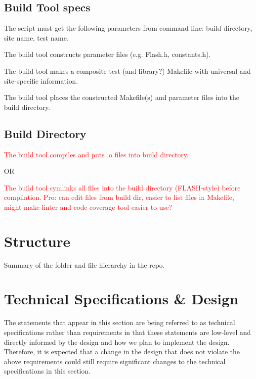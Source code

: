 \documentclass{article}
\begin{document}
\subsection{Build Tool specs}
\begin{spec}
The script must get the following parameters from command line: build directory, site name, test name.
\end{spec}
\begin{spec}
The build tool constructs parameter files (e.g. Flash.h, constants.h).
\end{spec}
\begin{spec}
The build tool makes a composite test (and library?) Makefile with universal and site-specific information.
\end{spec}
\begin{spec}
The build tool places the constructed Makefile(s) and parameter files into the build directory. 
\end{spec}

\subsection{Build Directory}
\begin{spec}
\textcolor{red}{The build tool compiles and puts .o files into build directory.}

OR

\textcolor{red}{The build tool symlinks all files into the build directory (FLASH-style) before compilation. Pro: can edit files from build dir, easier to list files in Makefile, might make linter and code coverage tool easier to use?}
\end{spec}

\section{Structure}
Summary of the folder and file hierarchy in the repo.

\section{Technical Specifications \& Design}
The statements that appear in this section are being referred to as technical
specifications rather than requirements in that these statements are low-level
and directly informed by the design and how we plan to implement the design.
Therefore, it is expected that a change in the design that does not violate the
above requirements could still require significant changes to the technical
specifications in this section.\\
\end{document}
